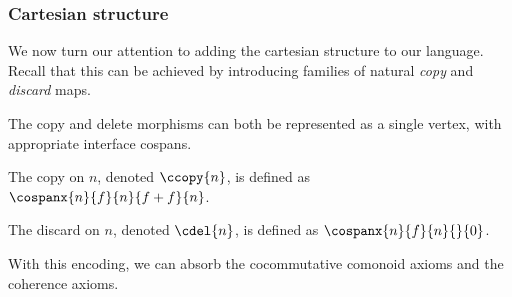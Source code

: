 \documentclass[10pt]{article}
\begin{document}
\subsubsection{Cartesian structure}

We now turn our attention to adding the cartesian structure to our language. 
Recall that this can be achieved by introducing families of natural \emph{copy} and \emph{discard} maps.

\begin{center}
    \toggletrue{stringtypes}
    
    
\end{center}

The copy and delete morphisms can both be represented as a single vertex, with appropriate interface cospans.

\begin{center}
    
    \qquad
    \raisebox{0.5em}{}
\end{center}

\begin{definition}[Copy]
    The copy on $n$, denoted $\ccopy{n}$, is defined as $\cospanx{n}{f}{n}{f + f}{n}$.
\end{definition}

\begin{definition}[Discard]
    The discard on $n$, denoted $\cdel{n}$, is defined as $\cospanx{n}{f}{n}{}{0}$.
\end{definition}

With this encoding, we can absorb the cocommutative comonoid axioms and the coherence axioms.
\end{document}
